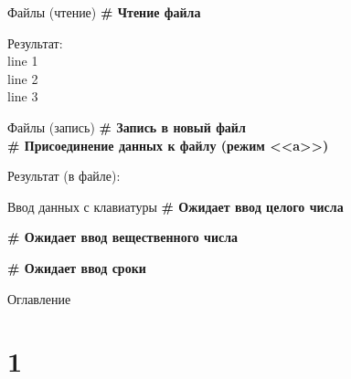 \documentclass[12pt]{beamer}
\begin{document}
\begin{frame}{Файлы (чтение)}
\textbf{\# Чтение файла} \\
\vspace{0.5cm}

\vspace{0.5cm}
Результат: \\
line 1 \\
line 2 \\
line 3 \\
\end{frame}


\begin{frame}{Файлы (запись)}
\textbf{\# Запись в новый файл} \\
\textbf{\# Присоединение данных к файлу (режим <<a>>)} \\
\vspace{0.5cm}

\vspace{0.5cm}
Результат (в файле): \\

\end{frame}


\begin{frame}{Ввод данных с клавиатуры}
\vspace{0.3cm}
\textbf{\# Ожидает ввод целого числа} 

\vspace{0.3cm}
\textbf{\# Ожидает ввод вещественного числа} 

\vspace{0.3cm}
\textbf{\# Ожидает ввод сроки} 

\end{frame}


\begin{frame}[t]{Оглавление}
\tableofcontents[part=1]
\end{frame}











\part{1}
\end{document}
